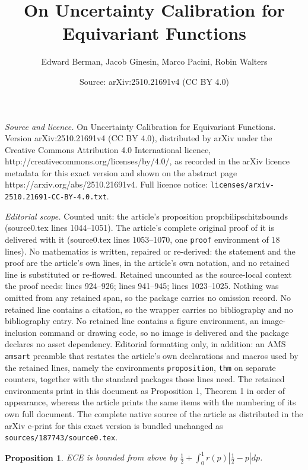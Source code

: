 \documentclass[10pt,a4paper]{amsart}
\title{On Uncertainty Calibration for Equivariant Functions}
\author{Edward Berman, Jacob Ginesin, Marco Pacini, Robin Walters}
\date{Source: arXiv:2510.21691v4 (CC BY 4.0)}
\newtheorem{proposition}{Proposition}
\begin{document}
\maketitle

\noindent\emph{Source and licence.} On Uncertainty Calibration for Equivariant Functions. Version arXiv:2510.21691v4 (CC BY 4.0), distributed by arXiv under the Creative Commons Attribution 4.0 International licence, http://creativecommons.org/licenses/by/4.0/, as recorded in the arXiv licence metadata for this exact version and shown on the abstract page https://arxiv.org/abs/2510.21691v4. Full licence notice: \texttt{licenses/arxiv-2510.21691-CC-BY-4.0.txt}.\par\smallskip

\noindent\textit{Editorial scope.} Counted unit: the article's proposition prop:bilipschitzbounds (source0.tex lines 1044--1051). The article's complete original proof of it is delivered with it (source0.tex lines 1053--1070, one \texttt{proof} environment of 18 lines). No mathematics is written, repaired or re-derived: the statement and the proof are the article's own lines, in the article's own notation, and no retained line is substituted or re-flowed.  Retained uncounted as the source-local context the proof needs: lines 924--926; lines 941--945; lines 1023--1025.  Nothing was omitted from any retained span, so the package carries no omission record.  No retained line contains a citation, so the wrapper carries no bibliography and no bibliography entry.  No retained line contains a figure environment, an image-inclusion command or drawing code, so no image is delivered and the package declares no asset dependency.  Editorial formatting only, in addition: an AMS \texttt{amsart} preamble that restates the article's own declarations and macros used by the retained lines, namely the environments \texttt{proposition}, \texttt{thm} on separate counters, together with the standard packages those lines need.  The retained environments print in this document as Proposition 1, Theorem 1 in order of appearance, whereas the article prints the same items with the numbering of its own full document.  The complete native source of the article as distributed in the arXiv e-print for this exact version is bundled unchanged as \texttt{sources/187743/source0.tex}.
\begin{proposition} \label{prop:naive}
ECE is bounded from above by $\frac{1}{2} + \int_0^{1}r(p)|\frac{1}{2} - p|dp$.
\end{proposition}
\end{document}
